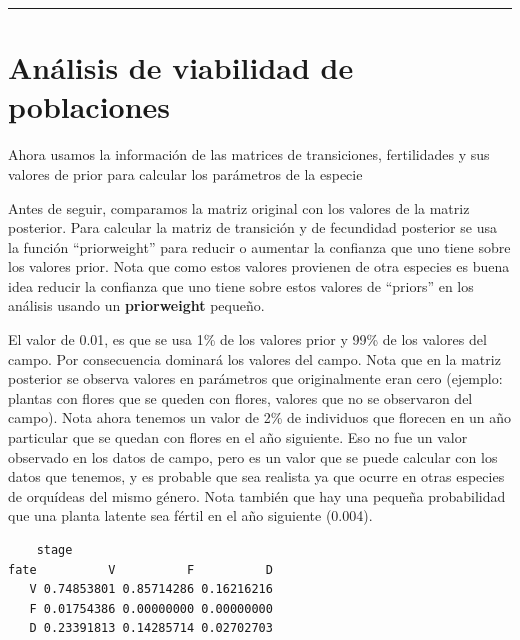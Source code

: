 \documentclass[
  12pt,
  letterpaper,
]{book}
\newenvironment{Shaded}{\begin{snugshade}}{\end{snugshade}}
\newcommand{\NormalTok}[1]{\textcolor[rgb]{0.00,0.23,0.31}{#1}}
\newcommand{\SpecialCharTok}[1]{\textcolor[rgb]{0.37,0.37,0.37}{#1}}
\begin{document}
\begin{center}\rule{0.5\linewidth}{0.5pt}\end{center}

\section{Análisis de viabilidad de
poblaciones}\label{anuxe1lisis-de-viabilidad-de-poblaciones}

Ahora usamos la información de las matrices de transiciones,
fertilidades y sus valores de prior para calcular los parámetros de la
especie

Antes de seguir, comparamos la matriz original con los valores de la
matriz posterior. Para calcular la matriz de transición y de fecundidad
posterior se usa la función ``priorweight'' para reducir o aumentar la
confianza que uno tiene sobre los valores prior. Nota que como estos
valores provienen de otra especies es buena idea reducir la confianza
que uno tiene sobre estos valores de ``priors'' en los análisis usando
un \textbf{priorweight} pequeño.

El valor de 0.01, es que se usa 1\% de los valores prior y 99\% de los
valores del campo. Por consecuencia dominará los valores del campo. Nota
que en la matriz posterior se observa valores en parámetros que
originalmente eran cero (ejemplo: plantas con flores que se queden con
flores, valores que no se observaron del campo). Nota ahora tenemos un
valor de 2\% de individuos que florecen en un año particular que se
quedan con flores en el año siguiente. Eso no fue un valor observado en
los datos de campo, pero es un valor que se puede calcular con los datos
que tenemos, y es probable que sea realista ya que ocurre en otras
especies de orquídeas del mismo género. Nota también que hay una pequeña
probabilidad que una planta latente sea fértil en el año siguiente
(0.004).

\begin{Shaded}
\end{Shaded}

\begin{verbatim}
    stage
fate          V          F          D
   V 0.74853801 0.85714286 0.16216216
   F 0.01754386 0.00000000 0.00000000
   D 0.23391813 0.14285714 0.02702703
\end{verbatim}
\end{document}
